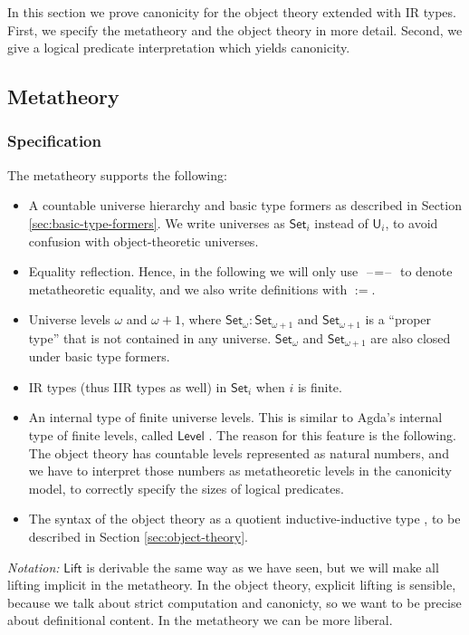 \documentclass[acmsmall,screen,review]{acmart}
\newcommand{\msf}[1]{{\mathsf{#1}}}
\newcommand{\U}{\msf{U}}
\newcommand{\Set}{\msf{Set}}
\newcommand{\Lift}{\msf{Lift}}
\newcommand{\blank}{{\mathord{\hspace{1pt}\text{--}\hspace{1pt}}}}
\newcommand{\Level}{\msf{Level}}
\begin{document}
In this section we prove canonicity for the object theory extended with IR types. First, we specify
the metatheory and the object theory in more detail. Second, we give a logical predicate
interpretation which yields canonicity.

\subsection{Metatheory}\label{sec:metatheory}

\subsubsection{Specification} The metatheory supports the following:
\begin{itemize}
  \item A countable universe hierarchy and basic type formers as described in Section \ref{sec:basic-type-formers}.
    We write universes as $\Set_i$ instead of $\U_i$, to avoid confusion with object-theoretic
    universes.
  \item Equality reflection. Hence, in the following we will only use $\blank\!=\!\blank$ to denote
    metatheoretic equality, and we also write definitions with $:=$.
  \item Universe levels $\omega$ and $\omega+1$, where $\Set_\omega : \Set_{\omega + 1}$ and $\Set_{\omega + 1}$
        is a ``proper type'' that is not contained in any universe. $\Set_\omega$ and $\Set_{\omega + 1}$ are
        also closed under basic type formers.
  \item IR types (thus IIR types as well) in $\Set_i$ when $i$ is finite.
  \item An internal type of finite universe levels. This is similar to Agda's internal type of
    finite levels, called $\Level$ \cite{agdadocs}. The reason for this feature is the following. The
    object theory has countable levels represented as natural numbers, and we have to interpret
    those numbers as metatheoretic levels in the canonicity model, to correctly specify the sizes of
    logical predicates.
  \item The syntax of the object theory as a quotient inductive-inductive type \cite{ttintt,DBLP:journals/corr/abs-2302-08837}, to be
    described in Section \ref{sec:object-theory}.
\end{itemize}
\emph{Notation:} $\Lift$ is derivable the same way as we have seen, but we will make all
lifting implicit in the metatheory. In the object theory, explicit lifting is sensible, because
we talk about strict computation and canonicty, so we want to be precise about definitional
content. In the metatheory we can be more liberal.
\end{document}
